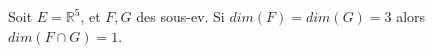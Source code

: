 Soit $E=\mathbb R^5$, et $F,G$ des sous-ev. Si $dim(F)=dim(G)=3$ alors $dim(F \cap G)=1$.

\begin{reponses}
\end{reponses}

